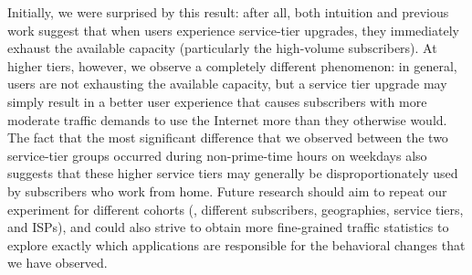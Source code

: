 Initially, we were surprised by this result: after all, both intuition
and previous work suggest that when users experience service-tier
upgrades, they immediately exhaust the available capacity (particularly
the high-volume subscribers). At higher tiers, however, we observe a
completely different phenomenon: in general, users are not exhausting
the available capacity, but a service tier upgrade may simply result in
a better user experience that causes subscribers with more moderate
traffic demands to use the Internet more than they otherwise would.  The
fact that the most significant difference that we observed between the two
service-tier groups
occurred during non-prime-time hours on
weekdays also suggests that these higher service tiers may generally be
disproportionately used by subscribers who work from home.  Future
research should aim to repeat our experiment for different cohorts (\ie,
different subscribers, geographies, service tiers, and ISPs), and could
also strive to obtain more fine-grained traffic statistics to explore
exactly which applications are responsible for the behavioral changes
that we have observed.
%
%
%
%
